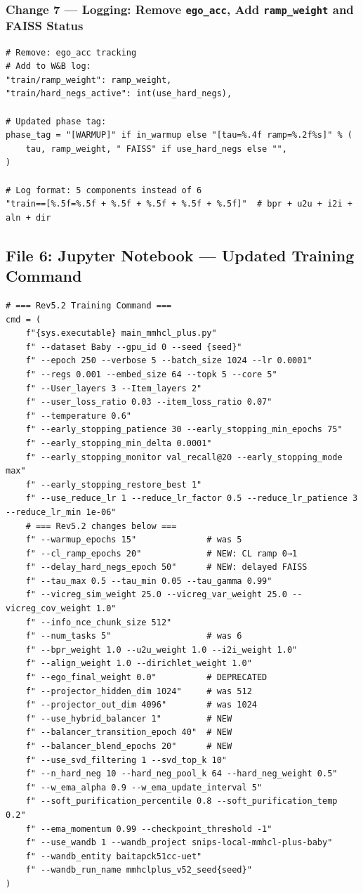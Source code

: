 \documentclass[11pt,a4paper]{article}
\begin{document}
\subsubsection*{Change 7 --- Logging: Remove \texttt{ego\_acc}, Add \texttt{ramp\_weight} and FAISS Status}
\begin{lstlisting}[style=pythonstyle]
# Remove: ego_acc tracking
# Add to W&B log:
"train/ramp_weight": ramp_weight,
"train/hard_negs_active": int(use_hard_negs),

# Updated phase tag:
phase_tag = "[WARMUP]" if in_warmup else "[tau=%.4f ramp=%.2f%s]" % (
    tau, ramp_weight, " FAISS" if use_hard_negs else "",
)

# Log format: 5 components instead of 6
"train==[%.5f=%.5f + %.5f + %.5f + %.5f + %.5f]"  # bpr + u2u + i2i + aln + dir
\end{lstlisting}

\subsection{File 6: Jupyter Notebook --- Updated Training Command}
\begin{lstlisting}[style=pythonstyle]
# === Rev5.2 Training Command ===
cmd = (
    f"{sys.executable} main_mmhcl_plus.py"
    f" --dataset Baby --gpu_id 0 --seed {seed}"
    f" --epoch 250 --verbose 5 --batch_size 1024 --lr 0.0001"
    f" --regs 0.001 --embed_size 64 --topk 5 --core 5"
    f" --User_layers 3 --Item_layers 2"
    f" --user_loss_ratio 0.03 --item_loss_ratio 0.07"
    f" --temperature 0.6"
    f" --early_stopping_patience 30 --early_stopping_min_epochs 75"
    f" --early_stopping_min_delta 0.0001"
    f" --early_stopping_monitor val_recall@20 --early_stopping_mode max"
    f" --early_stopping_restore_best 1"
    f" --use_reduce_lr 1 --reduce_lr_factor 0.5 --reduce_lr_patience 3 --reduce_lr_min 1e-06"
    # === Rev5.2 changes below ===
    f" --warmup_epochs 15"              # was 5
    f" --cl_ramp_epochs 20"             # NEW: CL ramp 0→1
    f" --delay_hard_negs_epoch 50"      # NEW: delayed FAISS
    f" --tau_max 0.5 --tau_min 0.05 --tau_gamma 0.99"
    f" --vicreg_sim_weight 25.0 --vicreg_var_weight 25.0 --vicreg_cov_weight 1.0"
    f" --info_nce_chunk_size 512"
    f" --num_tasks 5"                   # was 6
    f" --bpr_weight 1.0 --u2u_weight 1.0 --i2i_weight 1.0"
    f" --align_weight 1.0 --dirichlet_weight 1.0"
    f" --ego_final_weight 0.0"          # DEPRECATED
    f" --projector_hidden_dim 1024"     # was 512
    f" --projector_out_dim 4096"        # was 1024
    f" --use_hybrid_balancer 1"         # NEW
    f" --balancer_transition_epoch 40"  # NEW
    f" --balancer_blend_epochs 20"      # NEW
    f" --use_svd_filtering 1 --svd_top_k 10"
    f" --n_hard_neg 10 --hard_neg_pool_k 64 --hard_neg_weight 0.5"
    f" --w_ema_alpha 0.9 --w_ema_update_interval 5"
    f" --soft_purification_percentile 0.8 --soft_purification_temp 0.2"
    f" --ema_momentum 0.99 --checkpoint_threshold -1"
    f" --use_wandb 1 --wandb_project snips-local-mmhcl-plus-baby"
    f" --wandb_entity baitapck51cc-uet"
    f" --wandb_run_name mmhclplus_v52_seed{seed}"
)
\end{lstlisting}
\end{document}

